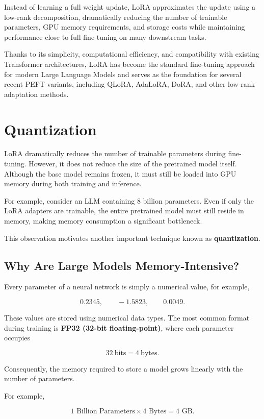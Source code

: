 Instead of learning a full weight update, LoRA approximates the update using a low-rank decomposition, dramatically reducing the number of trainable parameters, GPU memory requirements, and storage costs while maintaining performance close to full fine-tuning on many downstream tasks.

Thanks to its simplicity, computational efficiency, and compatibility with existing Transformer architectures, LoRA has become the standard fine-tuning approach for modern Large Language Models and serves as the foundation for several recent PEFT variants, including QLoRA, AdaLoRA, DoRA, and other low-rank adaptation methods.

\section{Quantization}

LoRA dramatically reduces the number of trainable parameters during fine-tuning. However, it does not reduce the size of the pretrained model itself. Although the base model remains frozen, it must still be loaded into GPU memory during both training and inference.

For example, consider an LLM containing 8 billion parameters. Even if only the LoRA adapters are trainable, the entire pretrained model must still reside in memory, making memory consumption a significant bottleneck.

This observation motivates another important technique known as \textbf{quantization}.
\subsection*{Why Are Large Models Memory-Intensive?}

Every parameter of a neural network is simply a numerical value, for example,

\[
0.2345,\qquad
-1.5823,\qquad
0.0049.
\]

These values are stored using numerical data types. The most common format during training is \textbf{FP32 (32-bit floating-point)}, where each parameter occupies

\[
32\ \text{bits}
=
4\ \text{bytes}.
\]

Consequently, the memory required to store a model grows linearly with the number of parameters.

For example,

\[
1\text{ Billion Parameters}
\times
4\text{ Bytes}
=
4\text{ GB}.
\]

